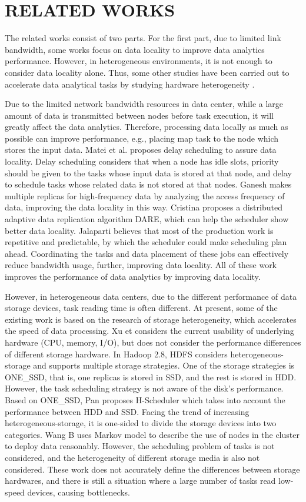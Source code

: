 \documentclass[conference]{IEEEtran}
\begin{document}
\section{RELATED WORKS}\label{RELATED_WORKS}
The related works consist of two parts. For the first part, due to limited link bandwidth, some works focus on data locality to improve data analytics performance. However, in heterogeneous environments, it is not enough to consider data locality alone. Thus, some other studies have been carried out to accelerate data analytical tasks by studying hardware heterogeneity \cite{b1}.

Due to the limited network bandwidth resources in data center, while a large amount of data is transmitted between nodes before task execution, it will greatly affect the data analytics. Therefore, processing data locally as much as possible can improve performance, e.g., placing map task to the node which stores the input data. Matei et al. \cite{b2} proposes delay scheduling to assure data locality. Delay scheduling considers that when a node has idle slots, priority should be given to  the tasks whose input data is stored at that node, and delay to schedule tasks whose related data is not stored at that nodes. Ganesh \cite{b3} makes multiple replicas for high-frequency data by analyzing the access frequency of data, improving the data locality in this way. Cristina \cite{b4} proposes a distributed adaptive data replication algorithm DARE, which can help the scheduler show better data locality. Jalaparti \cite{b5} believes that most of the production work is repetitive and predictable, by which the scheduler could make scheduling plan ahead. Coordinating the tasks and data placement of these jobs can effectively reduce bandwidth usage, further, improving data locality. All of these work improves the performance of data analytics by improving data locality.

However, in heterogeneous data centers, due to the different performance of data storage devices, task reading time is often different. At present, some of the existing work is based on the research of storage heterogeneity, which accelerates the speed of data processing. Xu et \cite{b6} considers the current usability of underlying hardware (CPU, memory, I/O), but does not consider the performance differences of different storage hardware. 
In Hadoop 2.8, HDFS\cite{b19} considers heterogeneous-storage and supports multiple storage strategies. One of the storage strategies is ONE\_SSD, that is, one replicas is stored in SSD, and the rest is stored in HDD. However, the task scheduling strategy is not aware of the disk's performance.
Based on ONE\_SSD, Pan \cite{b7} proposes H-Scheduler which takes into account the performance between HDD and SSD. Facing the trend of increasing heterogeneous-storage, it is one-sided to divide the storage devices into two categories. Wang B \cite{b8} uses Markov model to describe the use of nodes in the cluster to deploy data reasonably. However, the scheduling problem of tasks is not considered, and the heterogeneity of different storage media is also not considered. These work does not accurately define the differences between storage hardwares, and there is still a situation where a large number of tasks read low-speed devices, causing bottlenecks.
\end{document}
